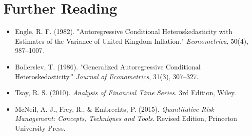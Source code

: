 \documentclass[11pt]{amsart}
\begin{document}
\section*{Further Reading}
\begin{itemize}
	\item Engle, R. F. (1982). "Autoregressive Conditional Heteroskedasticity with Estimates of the Variance of United Kingdom Inflation." \emph{Econometrica}, 50(4), 987–1007.
	\item Bollerslev, T. (1986). "Generalized Autoregressive Conditional Heteroskedasticity." \emph{Journal of Econometrics}, 31(3), 307–327.
	\item Tsay, R. S. (2010). \emph{Analysis of Financial Time Series}. 3rd Edition, Wiley.
	\item McNeil, A. J., Frey, R., \& Embrechts, P. (2015). \emph{Quantitative Risk Management: Concepts, Techniques and Tools}. Revised Edition, Princeton University Press.
\end{itemize}

\end{document}
